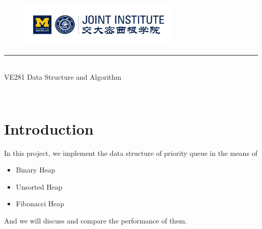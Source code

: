 \documentclass{article}
\begin{document}
\renewcommand\arraystretch{1.5}


\thispagestyle{empty}

\begin{center}
\begin{large}
\begin{figure}[!htbp]
\centering
\includegraphics[width=0.7\textwidth]{Logo2.png}
\end{figure}
\hrule
\vspace*{0.25cm}
 \\ 
VE281 Data Structure and Algorithm\\
\end{large}
\hrulefill

\vspace*{5cm}

\begin{Large}
 \\
\end{Large}
\vspace*{2em}
\begin{large}
\end{large}
\end{center}
\newpage
\setmainfont{Optima}
\setcounter{page}{1}
\section{Introduction}
\par In this project, we implement the data structure of priority queue in the means of 
\begin{itemize}
\item Binary Heap
\item Unsorted Heap
\item Fibonacci Heap
\end{itemize}
And we will discuss and compare the performance of them.
\end{document}
